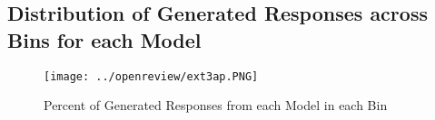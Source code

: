 \subsection{Distribution of Generated Responses across Bins for each Model}

\begin{figure}[H]
    \centering
    \texttt{[image: ../openreview/ext3ap.PNG]}
    \caption{Percent of Generated Responses from each Model in each Bin}
    \label{fig:fullExt3Results}
\end{figure}

